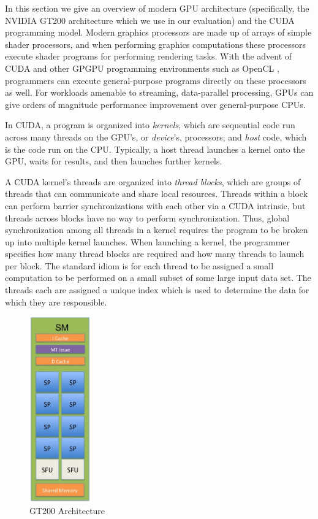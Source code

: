 \documentclass[preprint]{sigplanconf}
\begin{document}
In this section we give an overview of modern GPU architecture (specifically,
the NVIDIA GT200 architecture which we use in our evaluation) and the CUDA
programming model.  Modern graphics processors are made up of arrays of simple
shader processors, and when performing graphics computations these processors
execute shader programs for performing rendering tasks.  With the advent of CUDA
and other GPGPU programming environments such as OpenCL \cite{Muns08},
programmers can execute general-purpose programs directly on these processors as
well.  For workloads amenable to streaming, data-parallel processing, GPUs can
give orders of magnitude performance improvement over general-purpose CPUs.

In CUDA, a program is organized into {\it kernels}, which are sequential code
run across many threads on the GPU's, or {\it device}'s, processors; and {\it
host} code, which is the code run on the CPU.  Typically, a host thread launches
a kernel onto the GPU, waits for results, and then launches further kernels.

A CUDA kernel's threads are organized into {\it thread blocks}, which are groups
of threads that can communicate and share local resources.  Threads within a
block can perform barrier synchronizations with each other via a CUDA intrinsic,
but threads across blocks have no way to perform synchronization.  Thus, global
synchronization among all threads in a kernel requires the program to be broken
up into multiple kernel launches.  When launching a kernel, the programmer
specifies how many thread blocks are required and how many threads to launch per
block.  The standard idiom is for each thread to be assigned a small computation
to be performed on a small subset of some large input data set.  The threads
each are assigned a unique index which is used to determine the data for which
they are responsible.

\begin{figure}
\includegraphics[height=80mm]{GPUdiagram1.jpg}
\caption{GT200 Architecture}
\label{GPUdiagram}
\end{figure}
\end{document}
